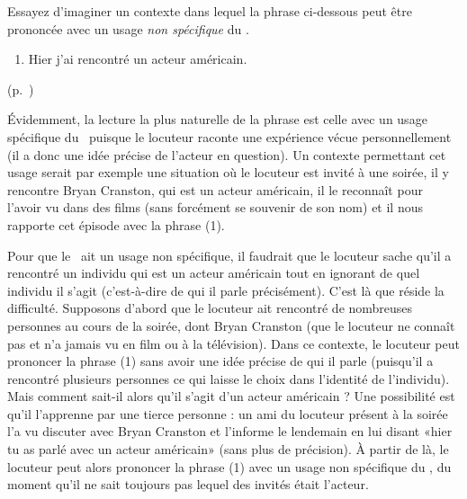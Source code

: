\begin{exo}\label{exo:Spec3}
Essayez d'imaginer un contexte dans lequel la phrase ci-dessous
%
peut être prononcée avec un usage \emph{non spécifique} du {\GN}
.  

\begin{enumerate}
\item Hier j'ai rencontré un acteur américain.
\end{enumerate}
%
\begin{solu} (p.~\pageref{exo:Spec3}) \label{crg:Spec3}

Évidemment, la lecture la plus naturelle de la phrase est celle avec un usage spécifique du \GN\ puisque le locuteur raconte une expérience vécue personnellement (il a donc une idée précise de l'acteur en question).   Un contexte permettant cet usage serait par exemple une situation où le locuteur est invité à une soirée, il y rencontre Bryan Cranston, qui est un acteur américain, il le reconnaît pour l'avoir vu dans des films (sans forcément se souvenir de son nom) et il nous rapporte cet épisode avec la phrase (1). 

Pour que le \GN\ ait un usage non spécifique, il faudrait que le locuteur sache qu'il a rencontré un individu qui est un acteur américain tout en ignorant de quel individu il s'agit (c'est-à-dire de qui il parle précisément).  C'est là que réside la difficulté.  Supposons d'abord que le locuteur ait rencontré de nombreuses personnes au cours de la soirée, dont Bryan Cranston (que le locuteur ne connaît pas et n'a jamais vu en film ou à la télévision).  Dans ce contexte, le locuteur peut prononcer la phrase (1) sans avoir une idée précise de qui il parle (puisqu'il a rencontré plusieurs personnes ce qui laisse le choix dans l'identité de l'individu).  Mais comment sait-il alors qu'il s'agit d'un acteur américain ?  Une possibilité est qu'il l'apprenne par une tierce personne : un ami du locuteur présent à la soirée l'a vu discuter avec Bryan Cranston et l'informe le lendemain en lui disant «hier tu as parlé avec un acteur américain» (sans plus de précision). À partir de là, le locuteur peut alors prononcer la phrase (1) avec un usage non spécifique du \GN, du moment qu'il ne sait toujours pas lequel des invités était l'acteur.
\end{solu}
\end{exo}
